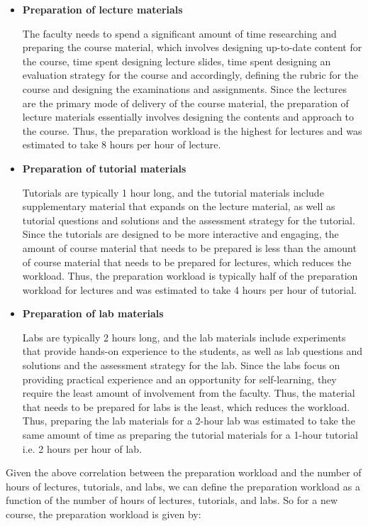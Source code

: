 \begin{itemize}
  \item \textbf{Preparation of lecture materials}

        The faculty needs to spend a significant amount of time researching and preparing the course material, which involves designing up-to-date content for the course, time spent designing lecture slides, time spent designing an evaluation strategy for the course and accordingly, defining the rubric for the course and designing the examinations and assignments. Since the lectures are the primary mode of delivery of the course material, the preparation of lecture materials essentially involves designing the contents and approach to the course. Thus, the preparation workload is the highest for lectures and was estimated to take 8 hours per hour of lecture.


  \item \textbf{Preparation of tutorial materials}

        Tutorials are typically 1 hour long, and the tutorial materials include supplementary material that expands on the lecture material, as well as tutorial questions and solutions and the assessment strategy for the tutorial. Since the tutorials are designed to be more interactive and engaging, the amount of course material that needs to be prepared is less than the amount of course material that needs to be prepared for lectures, which reduces the workload. Thus, the preparation workload is typically half of the preparation workload for lectures and was estimated to take 4 hours per hour of tutorial.

  \item \textbf{Preparation of lab materials}

        Labs are typically 2 hours long, and the lab materials include experiments that provide hands-on experience to the students, as well as lab questions and solutions and the assessment strategy for the lab. Since the labs focus on providing practical experience and an opportunity for self-learning, they require the least amount of involvement from the faculty. Thus, the material that needs to be prepared for labs is the least, which reduces the workload. Thus, preparing the lab materials for a 2-hour lab was estimated to take the same amount of time as preparing the tutorial materials for a 1-hour tutorial i.e. 2 hours per hour of lab.
\end{itemize}


Given the above correlation between the preparation workload and the number of hours of lectures, tutorials, and labs, we can define the preparation workload as a function of the number of hours of lectures, tutorials, and labs. So for a new course, the preparation workload is given by:

